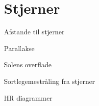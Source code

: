 \documentclass[crop=false, class=memoir]{standalone}
\begin{document}
\section{Stjerner}

\begin{opgave}{Afstande til stjerner}

\end{opgave}

\begin{opgave}{Parallakse}

\end{opgave}

\begin{opgave}{Solens overflade}

\end{opgave}

\begin{opgave}{Sortlegemestråling fra stjerner}

\end{opgave}

\begin{opgave}{HR diagrammer}

\end{opgave}

\begin{opgave}{}

\end{opgave}

\begin{opgave}{}

\end{opgave}

\begin{opgave}{}

\end{opgave}

\begin{opgave}{}

\end{opgave}
\end{document}
